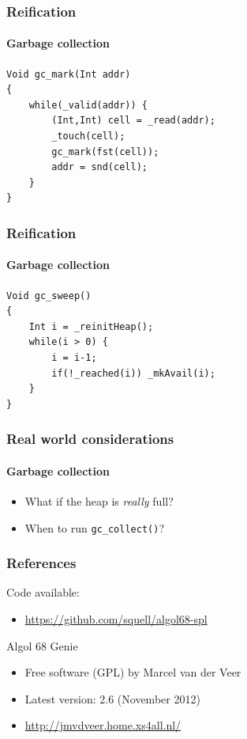 \documentclass{beamer}
\begin{document}
\begin{frame}[fragile]
\frametitle{Reification}
\framesubtitle{Garbage collection}
\begin{code}
\begin{lstlisting}
Void gc_mark(Int addr)
{
    while(_valid(addr)) {
        (Int,Int) cell = _read(addr);
        _touch(cell);
        gc_mark(fst(cell));
        addr = snd(cell);
    }
}
\end{lstlisting}
\end{code}
\end{frame}

\begin{frame}[fragile]
\frametitle{Reification}
\framesubtitle{Garbage collection}
\begin{code}
\begin{lstlisting}
Void gc_sweep()
{
    Int i = _reinitHeap();
    while(i > 0) {
        i = i-1;
        if(!_reached(i)) _mkAvail(i);
    }
}
\end{lstlisting}
\end{code}
\end{frame}

\begin{frame}[fragile]
\frametitle{Real world considerations}
\framesubtitle{Garbage collection}
\begin{itemize}
\item What if the heap is \emph{really} full?
\item When to run \texttt{gc\_collect()}?
\end{itemize}
\end{frame}

\begin{frame}
\frametitle{References}
Code available: 
\begin{itemize}
\item \url{https://github.com/squell/algol68-spl}
\end{itemize}

Algol 68 Genie
\begin{itemize}
\item Free software (GPL) by Marcel van der Veer
\item Latest version: 2.6 (November 2012)
\item \url{http://jmvdveer.home.xs4all.nl/}
\end{itemize}
\end{frame}
\end{document}
